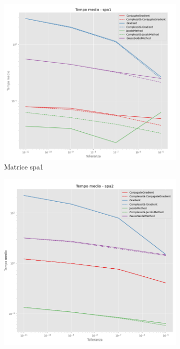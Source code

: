 \begin{figure}[!ht]
    \centering
    \begin{subfigure}{0.45\textwidth}
        \centering
        \includegraphics[width=\textwidth]{./../report/Progetto_1_bis/img/time_spa1.png}
        \caption{Matrice spa1}
        \label{fig:time_spa1}
    \end{subfigure}
    \hfill
    \begin{subfigure}{0.45\textwidth}
        \centering
        \includegraphics[width=\textwidth]{./../report/Progetto_1_bis/img/time_spa2.png}

\end{subfigure}
\end{figure}
